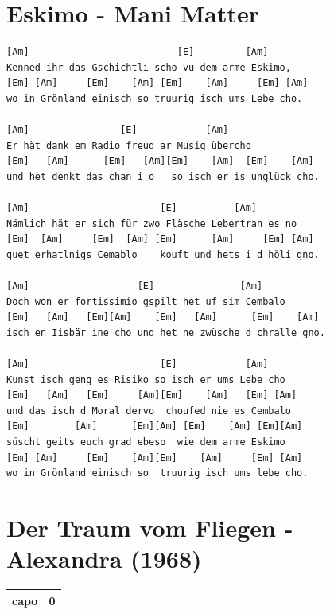 \documentclass[
]{book}
\let\stdsection\section
\renewcommand\section{\clearpage\stdsection}
\begin{document}
\hypertarget{mundart-und-deutsch-eskimo}{%
\section{Eskimo - Mani Matter}\label{mundart-und-deutsch-eskimo}}

\begin{verbatim}
[Am]                          [E]         [Am]
Kenned ihr das Gschichtli scho vu dem arme Eskimo,
[Em] [Am]     [Em]    [Am] [Em]    [Am]     [Em] [Am]
wo in Grönland einisch so truurig isch ums Lebe cho.

[Am]                [E]            [Am]
Er hät dank em Radio freud ar Musig übercho
[Em]   [Am]      [Em]   [Am][Em]    [Am]  [Em]    [Am]
und het denkt das chan i o   so isch er is unglück cho.

[Am]                       [E]          [Am]
Nämlich hät er sich für zwo Fläsche Lebertran es no
[Em]  [Am]     [Em]  [Am] [Em]      [Am]     [Em] [Am]
guet erhatlnigs Cemablo    kouft und hets i d höli gno.

[Am]                   [E]               [Am]
Doch won er fortissimio gspilt het uf sim Cembalo
[Em]   [Am]   [Em][Am]    [Em]   [Am]      [Em]    [Am]
isch en Iisbär ine cho und het ne zwüsche d chralle gno.

[Am]                       [E]            [Am]
Kunst isch geng es Risiko so isch er ums Lebe cho
[Em]   [Am]   [Em]     [Am][Em]    [Am]   [Em] [Am]
und das isch d Moral dervo  choufed nie es Cembalo
[Em]        [Am]      [Em][Am] [Em]    [Am] [Em][Am]
süscht geits euch grad ebeso  wie dem arme Eskimo
[Em] [Am]     [Em]    [Am][Em]    [Am]     [Em] [Am]
wo in Grönland einisch so  truurig isch ums lebe cho.

\end{verbatim}

\hypertarget{mundart-und-deutsch-der-traum-vom-fliegen}{%
\section{Der Traum vom Fliegen - Alexandra (1968)}\label{mundart-und-deutsch-der-traum-vom-fliegen}}

\begin{longtable}[]{@{}ll@{}}
\toprule
\endhead
capo & 0\tabularnewline
\bottomrule
\end{longtable}
\end{document}
